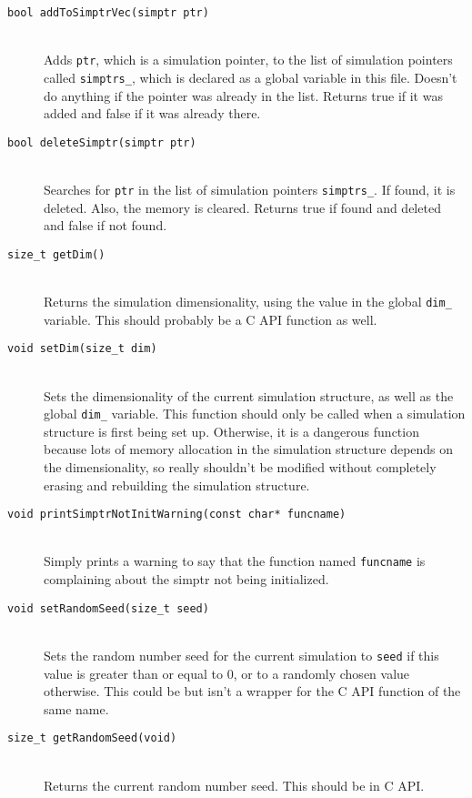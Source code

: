 \documentclass {book}
\newcommand {\ttt} {\texttt}
\begin{document}
\begin{description}

\item[\ttt{bool addToSimptrVec(simptr ptr)}]
\hfill \\
Adds \ttt{ptr}, which is a simulation pointer, to the list of simulation pointers called \ttt{simptrs\_}, which is declared as a global variable in this file. Doesn't do anything if the pointer was already in the list. Returns true if it was added and false if it was already there.

\item[\ttt{bool deleteSimptr(simptr ptr)}]
\hfill \\
Searches for \ttt{ptr} in the list of simulation pointers \ttt{simptrs\_}. If found, it is deleted. Also, the memory is cleared. Returns true if found and deleted and false if not found.

\item[\ttt{size\_t getDim()}]
\hfill \\
Returns the simulation dimensionality, using the value in the global \ttt{dim\_} variable. This should probably be a C API function as well.

\item[\ttt{void setDim(size\_t dim)}]
\hfill \\
Sets the dimensionality of the current simulation structure, as well as the global \ttt{dim\_} variable. This function should only be called when a simulation structure is first being set up. Otherwise, it is a dangerous function because lots of memory allocation in the simulation structure depends on the dimensionality, so really shouldn't be modified without completely erasing and rebuilding the simulation structure.

\item[\ttt{void printSimptrNotInitWarning(const char* funcname)}]
\hfill \\
Simply prints a warning to say that the function named \ttt{funcname} is complaining about the simptr not being initialized.

\item[\ttt{void setRandomSeed(size\_t seed)}]
\hfill \\
Sets the random number seed for the current simulation to \ttt{seed} if this value is greater than or equal to 0, or to a randomly chosen value otherwise. This could be but isn't a wrapper for the C API function of the same name.

\item[\ttt{size\_t getRandomSeed(void)}]
\hfill \\
Returns the current random number seed. This should be in C API.


\end{description}
\end{document}
